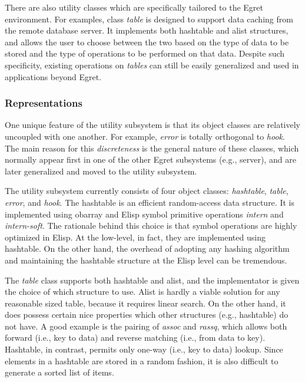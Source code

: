 There are also utility classes which are specifically tailored to the Egret
environment. For examples, class {\it table\/} is designed to support data
caching from the remote database server. It implements both hashtable and
alist structures, and allows the user to choose between the two based on
the type of data to be stored and the type of operations to be performed on
that data. Despite such specificity, existing operations on {\it tables\/}
can still be easily generalized and used in applications beyond Egret.


\subsubsection{Representations}

One unique feature of the utility subsystem is that its object classes are
relatively uncoupled with one another. For example, {\it error \/} is
totally orthogonal to {\it hook\/}. The main reason for this {\it
discreteness\/} is the general nature of these classes, which normally
appear first in one of the other Egret subsystems (e.g., server), and are
later generalized and moved to the utility subsystem. 

The utility subsystem currently consists of four object classes: {\it
hashtable\/}, {\it table\/}, {\it error\/}, and {\it hook\/}. The hashtable
is an efficient random-access data structure. It is implemented using
obarray and Elisp symbol primitive operations {\it intern\/} and {\it
intern-soft\/}. The rationale behind this choice is that symbol operations
are highly optimized in Elisp. At the low-level, in fact, they are
implemented using hashtable. On the other hand, the overhead of adopting
any hashing algorithm and maintaining the hashtable structure at the Elisp
level can be tremendous.

The {\it table \/} class supports both hashtable and alist, and the
implementator is given the choice of which structure to use. Alist is
hardly a viable solution for any reasonable sized table, because it
requires linear search. On the other hand, it does possess certain nice
properties which other structures (e.g., hashtable) do not have. A good
example is the pairing of {\it assoc\/} and {\it rassq\/}, which allows
both forward (i.e., key to data) and reverse matching (i.e., from data to
key).  Hashtable, in contrast, permits only one-way (i.e., key to data)
lookup. Since elements in a hashtable are stored in a random fashion, it is
also difficult to generate a sorted list of items. 

